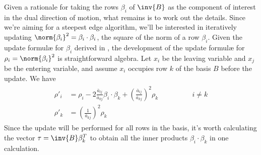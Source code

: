 Given a rationale for taking the rows $\beta_i$ of $\inv{B}$ as the
component of interest in the dual direction of motion, what remains is to work
out the details.
Since we're aiming for a steepest edge algorithm, we'll be interested in
iteratively updating $\norm{\beta_i}^2 = \beta_i \cdot \beta_i$, the square
of the norm of a row $\beta_i$.
Given the update formul\ae{} for $\beta_i$ derived in
,
the development of the update formul\ae{} for $\rho_i = \norm{\beta_i}^2$ is
straightforward algebra.
Let $x_i$ be the leaving variable and $x_j$ be the entering variable, and
assume $x_i$ occupies row $k$ of the basis $B$ before the update.
We have
\begin{align}
\begin{alignedat}{2}
\rho'_i & = \rho_i -
	    2\frac{\overline{a}_{lj}}{\overline{a}_{kj}}\beta_i\cdot\beta_k +
	    (\frac{\overline{a}_{lj}}{\overline{a}_{kj}})^2\rho_k &
	    \qquad\qquad i \neq k \\
\rho'_k & = (\frac{1}{\overline{a}_{kj}})^2\rho_k
\end{alignedat}
\end{align}
Since the update will be performed for all rows in the basis, it's worth
calculating the vector $\tau = \inv{B}\beta^T_k$ to obtain all the inner
products $\beta_i \cdot \beta_k$ in one calculation.

